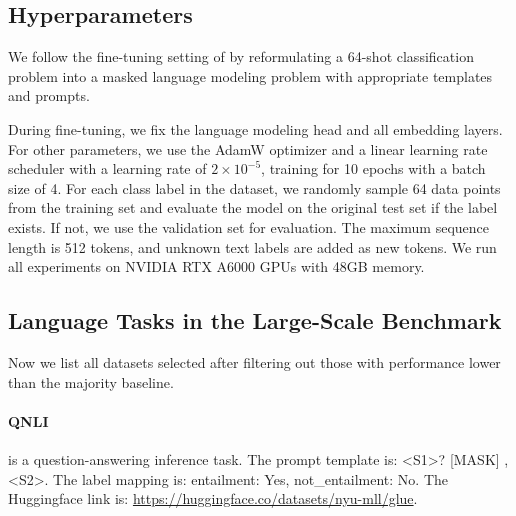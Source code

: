 \begin{table}[tb]
{\begin{tabular}{l|cccccccccccc|c}
            \cellcolor{mygray}{\quad - Stitch Twice} & \cellcolor{mygray}{88.3} & \cellcolor{mygray}{88.5} & \cellcolor{mygray}{83.5} & \cellcolor{mygray}{78.5} & \cellcolor{mygray}{78.6} & \cellcolor{mygray}{85.1} & \cellcolor{mygray}{54.3} & \cellcolor{mygray}{74.1} & \cellcolor{mygray}{62.8} & \cellcolor{mygray}{67.5} & \cellcolor{mygray}{81.4} & \cellcolor{mygray}{74.2} & \cellcolor{mygray}{\textbf{76.4}} 
            \\
            \bottomrule
        \end{tabular}}
\end{table}

\subsection{Hyperparameters}
We follow the fine-tuning setting of \citet{gao2020making} by reformulating a 64-shot classification problem into a masked language modeling problem with appropriate templates and prompts.

During fine-tuning, we fix the language modeling head and all embedding layers. For other parameters, we use the AdamW \citep{loshchilov2017decoupled} optimizer and a linear learning rate scheduler with a learning rate of $2 \times 10^{-5}$, training for 10 epochs with a batch size of 4. For each class label in the dataset, we randomly sample 64 data points from the training set and evaluate the model on the original test set if the label exists. If not, we use the validation set for evaluation. The maximum sequence length is 512 tokens, and unknown text labels are added as new tokens. We run all experiments on NVIDIA RTX A6000 GPUs with 48GB memory.

\subsection{Language Tasks in the Large-Scale Benchmark}
Now we list all datasets selected after filtering out those with performance lower than the majority baseline.

\paragraph{QNLI} \citep{wang2018glue} is a question-answering inference task. The prompt template is: \textless{}S1\textgreater{}? {[}MASK{]} , \textless{}S2\textgreater{}. The label mapping is: entailment: Yes, not\_entailment: No. The Huggingface link is: \url{https://huggingface.co/datasets/nyu-mll/glue}.

